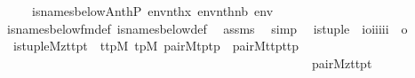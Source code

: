 \begin{isabellebody}
\ \ \ \ {\isasymlongleftrightarrow}\ is{\isacharunderscore}{\kern0pt}names{\isacharunderscore}{\kern0pt}below{\isacharparenleft}{\kern0pt}{\isacharhash}{\kern0pt}{\isacharhash}{\kern0pt}A{\isacharcomma}{\kern0pt}nth{\isacharparenleft}{\kern0pt}P{\isacharcomma}{\kern0pt}\ env{\isacharparenright}{\kern0pt}{\isacharcomma}{\kern0pt}nth{\isacharparenleft}{\kern0pt}x{\isacharcomma}{\kern0pt}\ env{\isacharparenright}{\kern0pt}{\isacharcomma}{\kern0pt}nth{\isacharparenleft}{\kern0pt}nb{\isacharcomma}{\kern0pt}\ env{\isacharparenright}{\kern0pt}{\isacharparenright}{\kern0pt}{\isachardoublequoteclose}\isanewline
%
\isadelimproof
\ \ %
\endisadelimproof
%
\isatagproof
{}\isamarkupfalse%
\ is{\isacharunderscore}{\kern0pt}names{\isacharunderscore}{\kern0pt}below{\isacharunderscore}{\kern0pt}fm{\isacharunderscore}{\kern0pt}def\ is{\isacharunderscore}{\kern0pt}names{\isacharunderscore}{\kern0pt}below{\isacharunderscore}{\kern0pt}def\ \isamarkupfalse%
\ assms\ \isamarkupfalse%
\ simp%
\endisatagproof
{\isafoldproof}%
%
\isadelimproof
\isanewline
%
\endisadelimproof
\isanewline
{}\isamarkupfalse%
\isanewline
\ \ is{\isacharunderscore}{\kern0pt}tuple\ {\isacharcolon}{\kern0pt}{\isacharcolon}{\kern0pt}\ {\isachardoublequoteopen}{\isacharbrackleft}{\kern0pt}i{\isasymRightarrow}o{\isacharcomma}{\kern0pt}i{\isacharcomma}{\kern0pt}i{\isacharcomma}{\kern0pt}i{\isacharcomma}{\kern0pt}i{\isacharcomma}{\kern0pt}i{\isacharbrackright}{\kern0pt}\ {\isasymRightarrow}\ o{\isachardoublequoteclose}\ \isanewline
\ \ {\isachardoublequoteopen}is{\isacharunderscore}{\kern0pt}tuple{\isacharparenleft}{\kern0pt}M{\isacharcomma}{\kern0pt}z{\isacharcomma}{\kern0pt}t{}{\isacharcomma}{\kern0pt}t{}{\isacharcomma}{\kern0pt}p{\isacharcomma}{\kern0pt}t{\isacharparenright}{\kern0pt}\ {\isasymequiv}\ {\isasymexists}t{}t{}p{\isacharbrackleft}{\kern0pt}M{\isacharbrackright}{\kern0pt}{\isachardot}{\kern0pt}\ {\isasymexists}t{}p{\isacharbrackleft}{\kern0pt}M{\isacharbrackright}{\kern0pt}{\isachardot}{\kern0pt}\ pair{\isacharparenleft}{\kern0pt}M{\isacharcomma}{\kern0pt}t{}{\isacharcomma}{\kern0pt}p{\isacharcomma}{\kern0pt}t{}p{\isacharparenright}{\kern0pt}\ {\isasymand}\ pair{\isacharparenleft}{\kern0pt}M{\isacharcomma}{\kern0pt}t{}{\isacharcomma}{\kern0pt}t{}p{\isacharcomma}{\kern0pt}t{}t{}p{\isacharparenright}{\kern0pt}\ {\isasymand}\isanewline
\ \ \ \ \ \ \ \ \ \ \ \ \ \ \ \ \ \ \ \ \ \ \ \ \ \ \ \ \ \ \ \ \ \ \ \ \ \ \ \ \ \ \ \ \ \ \ \ \ \ pair{\isacharparenleft}{\kern0pt}M{\isacharcomma}{\kern0pt}z{\isacharcomma}{\kern0pt}t{}t{}p{\isacharcomma}{\kern0pt}t{\isacharparenright}{\kern0pt}{\isachardoublequoteclose}\isanewline

\end{isabellebody}
